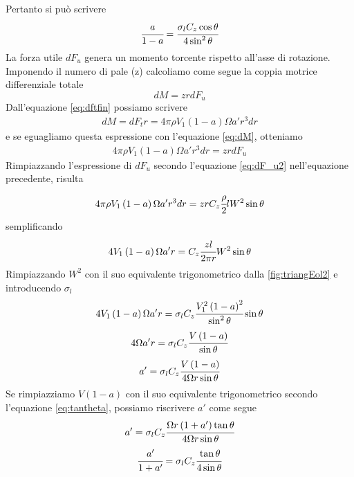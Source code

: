 Pertanto si può scrivere
\begin{equation}\label{eq:asolid}
\cfrac{a}{1-a} = \cfrac{\sigma_l C_z \cos \theta}{4 \sin^2 \theta}
\end{equation}
La forza utile $dF_u$ genera un momento torcente rispetto all'asse di rotazione. Imponendo il numero di pale (z) calcoliamo come segue la coppia motrice differenziale totale
\begin{equation}\label{eq:dM}
dM = z r dF_u
\end{equation}
Dall'equazione \ref{eq:dftfin} possiamo scrivere
\begin{align*}
dM = dF_t r = 4 \pi \rho V_1 \left( 1- a \right) \Omega a' r^3 dr
\end{align*}
e se eguagliamo questa espressione con l'equazione \ref{eq:dM}, otteniamo
\begin{align*}
4 \pi \rho V_1 \left(1-a \right) \Omega a' r^3 dr = z r dF_u
\end{align*}
Rimpiazzando l'espressione di $dF_u$ secondo l'equazione \ref{eq:dF_u2} nell'equazione precedente, risulta
\begin{align*}
4 \pi \rho V_1 \left(1-a \right) \Omega a' r^3 dr = z r C_z \cfrac{\rho}{2} l W^2 \sin \theta
\end{align*}
semplificando
\begin{align*}
4 V_1 \left(1-a \right) \Omega a' r = C_z \cfrac{z l }{2 \pi r} W^2 \sin \theta
\end{align*}
Rimpiazzando $W^2$ con il suo equivalente trigonometrico dalla \ref{fig:triangEol2} e introducendo $\sigma_l$
\begin{align*}
4 V_1 \left(1-a \right) \Omega a' r = \sigma_l C_z \cfrac{V_1^2 \left(1-a \right)^2}{\sin^2 \theta} \sin \theta
\end{align*}
\begin{align*}
4 \Omega a' r = \sigma_l C_z \cfrac{V \left(1-a \right)}{\sin \theta}
\end{align*}
\begin{align*}
a'= \sigma_l C_z \cfrac{V \left(1-a \right)}{4 \Omega r \sin \theta}
\end{align*}
Se rimpiazziamo $V \left(1-a\right)$ con il suo equivalente trigonometrico secondo l'equazione \ref{eq:tantheta}, possiamo riscrivere $a'$ come segue
\begin{align*}
a' = \sigma_l C_z \cfrac{\Omega r \left(1+a' \right) \tan \theta}{4 \Omega r \sin \theta}
\end{align*}
\begin{align*}
\cfrac{a'}{1+a'} = \sigma_l C_z \cfrac{\tan \theta}{4 \sin \theta}
\end{align*}
